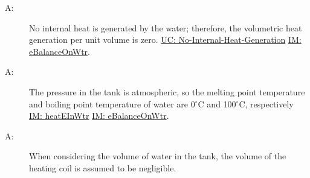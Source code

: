 \documentclass[12pt]{article}
\newcounter{assumpnum}
\newcommand{\atheassumpnum}{A\theassumpnum}
\begin{document}
\begin{description}
\item[\atheassumpnum\label{A:No-Internal-Heat-Generation-By-Water}:]No internal heat is generated by the water; therefore, the volumetric heat generation per unit volume is zero. \hyperref[unlikeChgNIHG]{UC: No-Internal-Heat-Generation} \hyperref[IM:eBalanceOnWtr]{IM: eBalanceOnWtr}.
\end{description}
\begin{description}
\item[\atheassumpnum\label{A:Atmospheric-Pressure-Tank}:]The pressure in the tank is atmospheric, so the melting point temperature and boiling point temperature of water are 0${}^{\circ}$C and 100${}^{\circ}$C, respectively \hyperref[IM:heatEInWtr]{IM: heatEInWtr} \hyperref[IM:eBalanceOnWtr]{IM: eBalanceOnWtr}.
\end{description}
\begin{description}
\item[\atheassumpnum\label{A:Volume-Coil-Negligible}:]When considering the volume of water in the tank, the volume of the heating coil is assumed to be negligible.
\end{description}
\end{document}
